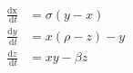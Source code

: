 \documentclass[preview]{standalone}
\begin{document}
\begin{center}
\[
            \begin{aligned}
            \frac{\mathrm{d} \mathrm{x}}{\mathrm{~d} {t}} & = \sigma ({y} - {x}) \\
            \frac{\mathrm{d} {y}}{\mathrm{~d} {t}} & = {x} (\rho - {z}) - {y} \\
            \frac{\mathrm{d} {z}}{\mathrm{~d} {t}} & = {x} {y} - \beta {z}
            \end{aligned}
            \]
\end{center}
\end{document}
